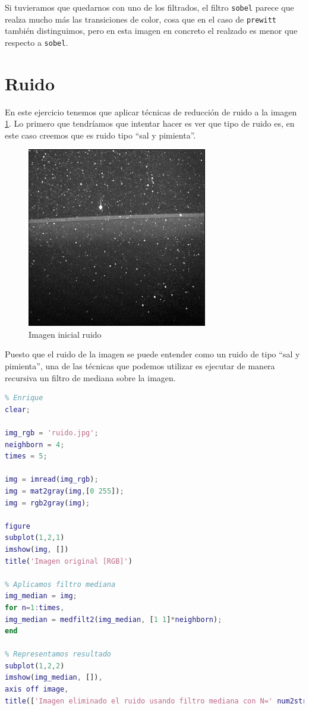 \documentclass[12pt]{article}
\begin{document}
	\noindent Si tuvieramos que quedarnos con uno de los filtrados, el filtro \texttt{sobel} parece que realza mucho más las transiciones de color, cosa que en el caso de \texttt{prewitt} también distinguimos, pero en esta imagen en concreto el realzado es menor que respecto a \texttt{sobel}.
	
	\pagebreak
	
	\section{Ruido}
	
	\noindent En este ejercicio tenemos que aplicar técnicas de reducción de ruido a la imagen \ref{img: ruido src}. Lo primero que tendríamos que intentar hacer es ver que tipo de ruido es, en este caso creemos que es ruido tipo ``sal y pimienta''.
	
	\begin{figure}[h]
		\begin{center}
			\includegraphics[width=0.7\textwidth]{img/ruido.jpg}
			\caption{Imagen inicial ruido}
			\label{img: ruido src}
		\end{center}
	\end{figure}
	
	\noindent Puesto que el ruido de la imagen se puede entender como un ruido de tipo ``sal y pimienta'', una de las técnicas que podemos utilizar es ejecutar de manera recursiva un filtro de mediana sobre la imagen.
	
	\begin{lstlisting}[language=Matlab, caption={Implementación filtro mediana para reducir ruido en MATLAB}]
% 6 - Ruido Sal y Pimienta
% Enrique
clear;

img_rgb = 'ruido.jpg';
neighborn = 4;
times = 5;

img = imread(img_rgb);
img = mat2gray(img,[0 255]);
img = rgb2gray(img);

figure
subplot(1,2,1)
imshow(img, [])
title('Imagen original [RGB]')

% Aplicamos filtro mediana
img_median = img;
for n=1:times,
img_median = medfilt2(img_median, [1 1]*neighborn);
end

% Representamos resultado
subplot(1,2,2)
imshow(img_median, []),
axis off image,
title(['Imagen eliminado el ruido usando filtro mediana con N=' num2str(neighborn) ' T=' num2str(times) ])
	\end{lstlisting}
\end{document}
